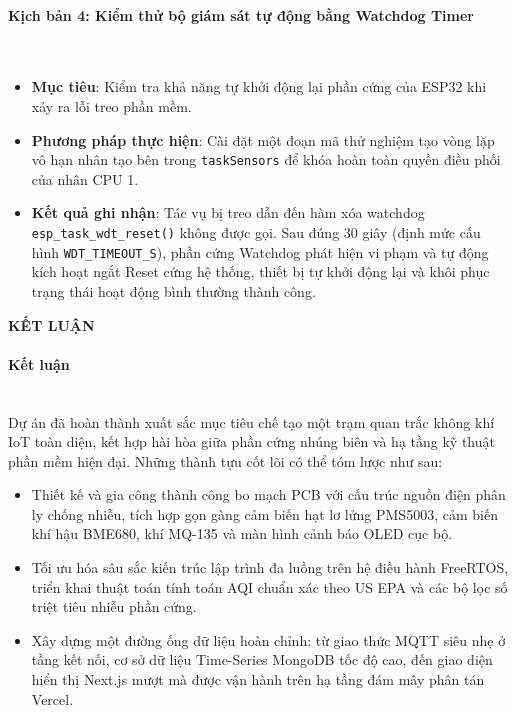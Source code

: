 \documentclass[12pt,a4paper]{article}
\begin{document}
\paragraph{Kịch bản 4: Kiểm thử bộ giám sát tự động bằng Watchdog Timer}\mbox{}\\
\begin{itemize}
    \item \textbf{Mục tiêu}: Kiểm tra khả năng tự khởi động lại phần cứng của ESP32 khi xảy ra lỗi treo phần mềm.
    \item \textbf{Phương pháp thực hiện}: Cài đặt một đoạn mã thử nghiệm tạo vòng lặp vô hạn nhân tạo bên trong \texttt{taskSensors} để khóa hoàn toàn quyền điều phối của nhân CPU 1.
    \item \textbf{Kết quả ghi nhận}: Tác vụ bị treo dẫn đến hàm xóa watchdog \texttt{esp\_task\_wdt\_reset()} không được gọi. Sau đúng 30 giây (định mức cấu hình \texttt{WDT\_TIMEOUT\_S}), phần cứng Watchdog phát hiện vi phạm và tự động kích hoạt ngắt Reset cứng hệ thống, thiết bị tự khởi động lại và khôi phục trạng thái hoạt động bình thường thành công.
\end{itemize}

\newpage
\begin{center}
    \textbf{\Large KẾT LUẬN}
\end{center}

\paragraph*{Kết luận}\mbox{}\\
Dự án đã hoàn thành xuất sắc mục tiêu chế tạo một trạm quan trắc không khí IoT toàn diện, kết hợp hài hòa giữa phần cứng nhúng biên và hạ tầng kỹ thuật phần mềm hiện đại. Những thành tựu cốt lõi có thể tóm lược như sau:
\begin{itemize}
    \item Thiết kế và gia công thành công bo mạch PCB với cấu trúc nguồn điện phân ly chống nhiễu, tích hợp gọn gàng cảm biến hạt lơ lửng PMS5003, cảm biến khí hậu BME680, khí MQ-135 và màn hình cảnh báo OLED cục bộ.
    \item Tối ưu hóa sâu sắc kiến trúc lập trình đa luồng trên hệ điều hành FreeRTOS, triển khai thuật toán tính toán AQI chuẩn xác theo US EPA và các bộ lọc số triệt tiêu nhiễu phần cứng.
    \item Xây dựng một đường ống dữ liệu hoàn chỉnh: từ giao thức MQTT siêu nhẹ ở tầng kết nối, cơ sở dữ liệu Time-Series MongoDB tốc độ cao, đến giao diện hiển thị Next.js mượt mà được vận hành trên hạ tầng đám mây phân tán Vercel.
\end{itemize}
\end{document}
